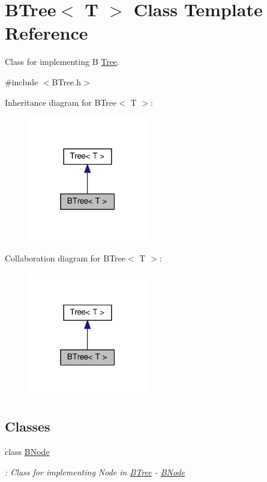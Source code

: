 \hypertarget{classBTree}{}\section{B\+Tree$<$ T $>$ Class Template Reference}
\label{classBTree}


Class for implementing B \hyperlink{classTree}{Tree}.  




{\ttfamily \#include $<$B\+Tree.\+h$>$}



Inheritance diagram for B\+Tree$<$ T $>$\+:
\nopagebreak
\begin{figure}[H]
\begin{center}
\leavevmode
\includegraphics[width=147pt]{classBTree__inherit__graph}
\end{center}
\end{figure}


Collaboration diagram for B\+Tree$<$ T $>$\+:
\nopagebreak
\begin{figure}[H]
\begin{center}
\leavevmode
\includegraphics[width=147pt]{classBTree__coll__graph}
\end{center}
\end{figure}
\subsection*{Classes}
\begin{DoxyCompactItemize}
\item 
class \hyperlink{classBTree_1_1BNode}{B\+Node}
\begin{DoxyCompactList}\small\item\em \+: Class for implementing Node in \hyperlink{classBTree}{B\+Tree} -\/ \hyperlink{classBTree_1_1BNode}{B\+Node} \end{DoxyCompactList}\end{DoxyCompactItemize}
